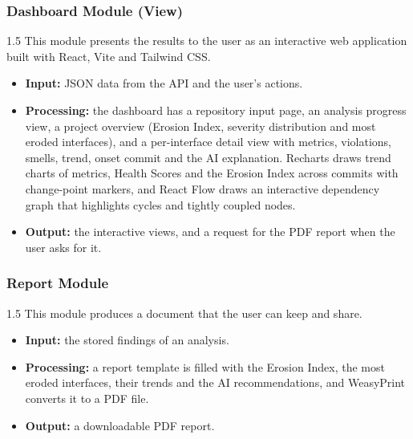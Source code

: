 \documentclass[12pt,a4paper]{article}
\begin{document}
\subsubsection{Dashboard Module (View)}
 
\begin{spacing}{1.5}
\justifying
This module presents the results to the user as an interactive web application built with React, Vite and Tailwind CSS.
 
\begin{itemize}[leftmargin=*,itemsep=2pt]
  \item \textbf{Input:} JSON data from the API and the user's actions.
  \item \textbf{Processing:} the dashboard has a repository input page, an analysis progress view, a project overview (Erosion Index, severity distribution and most eroded interfaces), and a per-interface detail view with metrics, violations, smells, trend, onset commit and the AI explanation. Recharts draws trend charts of metrics, Health Scores and the Erosion Index across commits with change-point markers, and React Flow draws an interactive dependency graph that highlights cycles and tightly coupled nodes.
  \item \textbf{Output:} the interactive views, and a request for the PDF report when the user asks for it.
\end{itemize}
\end{spacing}
 
\subsubsection{Report Module}
 
\begin{spacing}{1.5}
\justifying
This module produces a document that the user can keep and share.
 
\begin{itemize}[leftmargin=*,itemsep=2pt]
  \item \textbf{Input:} the stored findings of an analysis.
  \item \textbf{Processing:} a report template is filled with the Erosion Index, the most eroded interfaces, their trends and the AI recommendations, and WeasyPrint converts it to a PDF file.
  \item \textbf{Output:} a downloadable PDF report.
\end{itemize}
\end{spacing}
 
\end{document}
